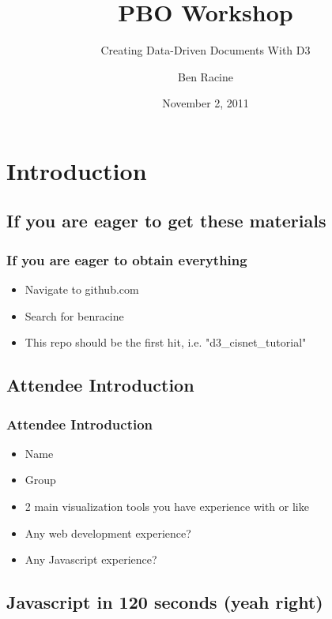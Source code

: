 \documentclass{beamer}
\title{PBO Workshop}
\subtitle{Creating Data-Driven Documents With D3}
\author{Ben Racine \inst{1} }
\institute{\inst{1} Cornerstone Systems NW }
\date{November 2, 2011}
\begin{document}
\begin{frame}
    \frametitle{}
    \titlepage
\end{frame}






\section{Introduction}


\subsection{If you are eager to get these materials}


\begin{frame}
    \frametitle{If you are eager to obtain everything}
    \begin{itemize}
\pause
    \item Navigate to github.com
\pause
    \item Search for benracine
\pause
    \item This repo should be the first hit, i.e. "d3\_cisnet\_tutorial"
    \end{itemize}
\end{frame}


\subsection{Attendee Introduction}


\begin{frame}
    \frametitle{Attendee Introduction}
    \begin{itemize}
\pause
    \item Name
    \item Group
    \item 2 main visualization tools you have experience with or like
    \item Any web development experience?
    \item Any Javascript experience?
    \end{itemize}
\end{frame}


\subsection{Javascript in 120 seconds (yeah right)}
\end{document}
